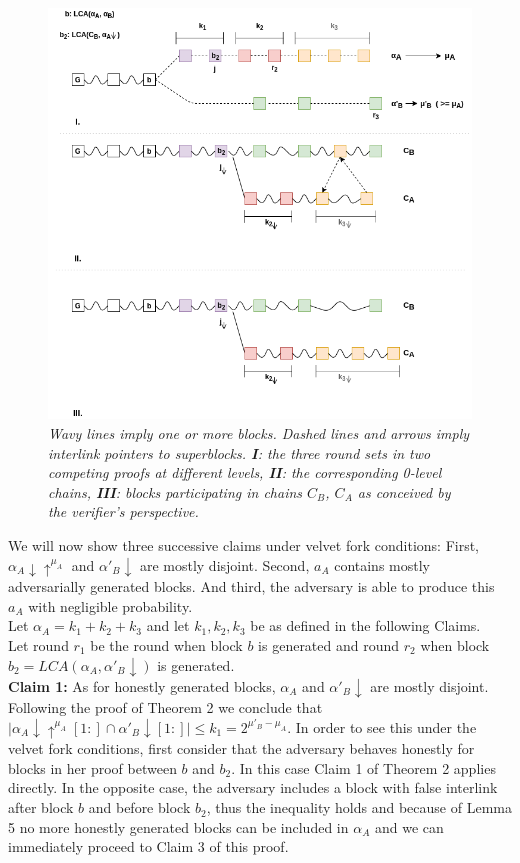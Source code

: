 \begin{figure}[h!]
	\begin{center}
		\includegraphics[scale=0.5]{figures/proof_velvet.png}
	\end{center}
	\caption{\textit{ Wavy lines imply one or more blocks. Dashed lines and arrows imply interlink pointers to superblocks. \textbf{I}: the three round sets in two competing proofs at different levels, \textbf{II}: the corresponding 0-level chains, \textbf{III}: blocks participating in chains $C_B$, $C_A$ as conceived by the verifier's perspective.}}
	\label{fig:proof_velvet}
\end{figure}

We will now show three successive claims under velvet fork conditions: First, $\alpha_A \downarrow \uparrow^{\mu_A}$ and $\alpha'_B \downarrow$ are mostly disjoint. Second, $a_A$ contains mostly adversarially generated blocks. And third, the adversary is able to produce this $a_A$ with negligible probability.\\
Let $\alpha_A = k_1 + k_2 + k_3$ and let $k_1, k_2, k_3$ be as defined in the following Claims.\\
Let round $r_1$ be the round when block $b$ is generated and round $r_2$ when block $b_2 = LCA(\alpha_A, \alpha'_B\downarrow)$ is generated.\\

\textbf{Claim 1:} As for honestly generated blocks, $\alpha_A$ and $ \alpha'_B\downarrow$ are mostly disjoint. Following the proof of Theorem 2 we conclude that $\vert \alpha_A\downarrow\uparrow^{\mu_A}[1:] \cap \alpha'_B\downarrow[1:] \vert \leq k_{1} = 2^{\mu'_B - \mu_A}$. In order to see this under the velvet fork conditions, first consider that the adversary behaves honestly for blocks in her proof between $b$ and $b_2$. In this case Claim 1 of Theorem 2 applies directly. In the opposite case, the adversary includes a block with false interlink after block $b$ and before block $b_2$, thus the inequality holds and because of Lemma 5 no more honestly generated blocks can be included in $\alpha_A$ and we can immediately proceed to Claim 3 of this proof.

